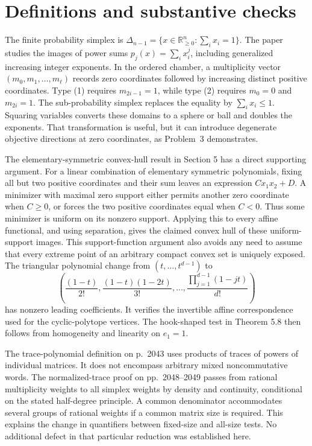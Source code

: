 \documentclass[10pt]{article}
\begin{document}
\section*{Definitions and substantive checks}
The finite probability simplex is \(\Delta_{n-1}=\{x\in\mathbb R_{\geq0}^n:\sum_i x_i=1\}\). The paper studies the images of power sums \(p_j(x)=\sum_i x_i^j\), including generalized increasing integer exponents. In the ordered chamber, a multiplicity vector \((m_0,m_1,\ldots,m_\ell)\) records zero coordinates followed by increasing distinct positive coordinates. Type (1) requires \(m_{2i-1}=1\), while type (2) requires \(m_0=0\) and \(m_{2i}=1\). The sub-probability simplex replaces the equality by \(\sum_i x_i\leq1\). Squaring variables converts these domains to a sphere or ball and doubles the exponents. That transformation is useful, but it can introduce degenerate objective directions at zero coordinates, as Problem 3 demonstrates.\par
The elementary-symmetric convex-hull result in Section 5 has a direct supporting argument. For a linear combination of elementary symmetric polynomials, fixing all but two positive coordinates and their sum leaves an expression \(C x_1x_2+D\). A minimizer with maximal zero support either permits another zero coordinate when \(C\geq0\), or forces the two positive coordinates equal when \(C<0\). Thus some minimizer is uniform on its nonzero support. Applying this to every affine functional, and using separation, gives the claimed convex hull of these uniform-support images. This support-function argument also avoids any need to assume that every extreme point of an arbitrary compact convex set is uniquely exposed. The triangular polynomial change from \((t,\ldots,t^{d-1})\) to \[\left(\frac{(1-t)}{2!},\frac{(1-t)(1-2t)}{3!},
 \ldots,\frac{\prod_{j=1}^{d-1}(1-jt)}{d!}\right)\] has nonzero leading coefficients. It verifies the invertible affine correspondence used for the cyclic-polytope vertices. The hook-shaped test in Theorem 5.8 then follows from homogeneity and linearity on \(e_1=1\).\par
The trace-polynomial definition on p. 2043 uses products of traces of powers of individual matrices. It does not encompass arbitrary mixed noncommutative words. The normalized-trace proof on pp. 2048–2049 passes from rational multiplicity weights to all simplex weights by density and continuity, conditional on the stated half-degree principle. A common denominator accommodates several groups of rational weights if a common matrix size is required. This explains the change in quantifiers between fixed-size and all-size tests. No additional defect in that particular reduction was established here.\par
\end{document}

